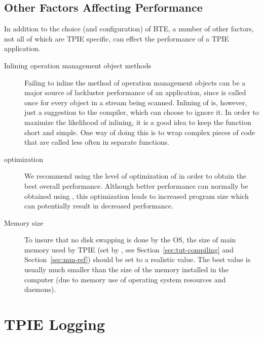 \subsection{Other Factors Affecting Performance}

In addition to the choice (and configuration) of BTE, a number of other
factors, not all of which are TPIE specific, can effect the performance of
a TPIE application.

\begin{description}
    \item[Inlining operation management object methods]
    Failing to inline the  method of
    operation management objects can be a major source of
    lackluster performance of an application, since
     is called once for every object in a
    stream being scanned. Inlining of  is,
    however, just a suggestion to the compiler, which can
    choose to ignore it. In order to maximize the likelihood
    of inlining, it is a good idea to keep the function
    short and simple. One way of doing this is to wrap
    complex pieces of code that are called less often in
    separate functions.
    \item[ optimization] We recommend using the
     level of optimization of  in
    order to obtain the best overall performance. Although
    better performance can normally be obtained using
    , this optimization leads to increased
    program size which can potentially result in decreased
    performance.
    \item[Memory size] To insure that no disk swapping is
    done by the OS, the size of main memory used by TPIE
    (set by , see
    Section~\ref{sec:tut-compiling} and Section~\ref{sec:mm-ref})
    should be set to a realistic value. The best value is
    usually much smaller than the size of the memory
    installed in the computer (due to memory use of
    operating system resources and daemons).
\end{description}



\section{TPIE Logging}

